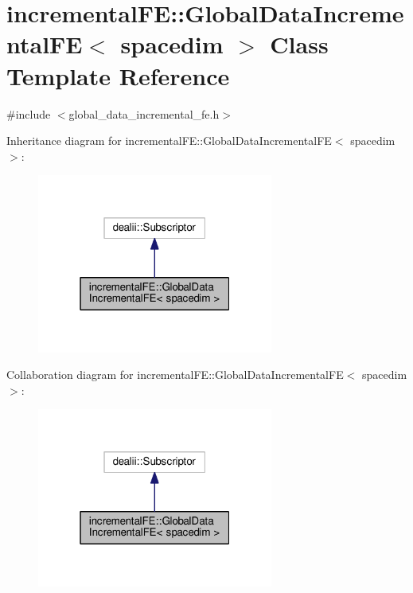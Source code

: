 \hypertarget{classincremental_f_e_1_1_global_data_incremental_f_e}{}\section{incremental\+FE\+:\+:Global\+Data\+Incremental\+FE$<$ spacedim $>$ Class Template Reference}
\label{classincremental_f_e_1_1_global_data_incremental_f_e}


{\ttfamily \#include $<$global\+\_\+data\+\_\+incremental\+\_\+fe.\+h$>$}



Inheritance diagram for incremental\+FE\+:\+:Global\+Data\+Incremental\+FE$<$ spacedim $>$\+:\nopagebreak
\begin{figure}[H]
\begin{center}
\leavevmode
\includegraphics[width=220pt]{classincremental_f_e_1_1_global_data_incremental_f_e__inherit__graph}
\end{center}
\end{figure}


Collaboration diagram for incremental\+FE\+:\+:Global\+Data\+Incremental\+FE$<$ spacedim $>$\+:\nopagebreak
\begin{figure}[H]
\begin{center}
\leavevmode
\includegraphics[width=220pt]{classincremental_f_e_1_1_global_data_incremental_f_e__coll__graph}
\end{center}
\end{figure}
